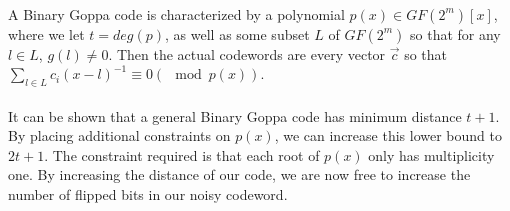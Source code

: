 \documentclass{article}
\theoremstyle{definition}
\begin{document}
\paragraph{}
A Binary Goppa code is characterized by a polynomial $p(x) \in GF(2^m)[x]$, where we let $t = deg(p)$, as well as some subset $L$ of $GF(2^m)$ so that for any $l\in L$, $g(l) \not = 0$. Then the actual codewords are every vector $\vec{c}$ so that $\sum_{l\in L} c_i (x-l)^{-1} \equiv 0 (\mod p(x))$. 

\paragraph{}
It can be shown that a general Binary Goppa code has minimum distance $t+1$. By placing additional constraints on $p(x)$, we can increase this lower bound to $2t+1$. The constraint required is that each root of $p(x)$ only has multiplicity one. By increasing the distance of our code, we are now free to increase the number of flipped bits in our noisy codeword.
\end{document}
